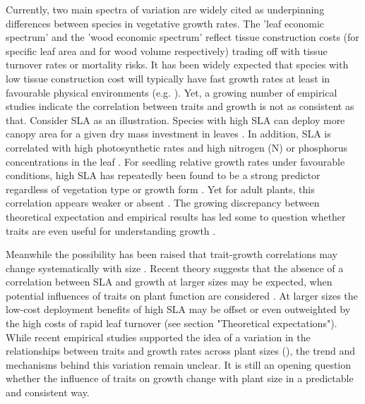 \documentclass[a4paper]{article}\usepackage[]{graphicx}\usepackage[]{color}
\begin{document}
Currently, two main spectra of variation are widely cited as underpinning differences between species in vegetative growth rates. The 'leaf economic spectrum' \citep{Wright:2004jb} and the 'wood economic spectrum' \citep{Chave:2009iy} reflect tissue construction costs (for specific leaf area and for wood volume respectively) trading off with tissue turnover rates or mortality risks. It has been widely expected that species with low tissue construction cost will typically have fast growth rates at least in favourable physical environments (e.g. \citealt{MullerLandau:2004dc,Wright:2004jb,Poorter:2008iu,Chave:2009iy,Larjavaara:2010bn,Iida:2012jb,Paine:2015df}). Yet, a growing number of empirical studies indicate the correlation between traits and growth is not as consistent as that. Consider SLA as an illustration. Species with high SLA can deploy more canopy area for a given dry mass investment in leaves \citep{Poorter:1999wd, Reich:1992wm}. In addition, SLA is correlated with high photosynthetic rates and high nitrogen (N) or phosphorus concentrations in the leaf \citep{Wright:2004jb}. For seedling relative growth rates under favourable conditions, high SLA has repeatedly been found to be a strong predictor regardless of vegetation type or growth form \citep{Lambers:1992bj,Reich:1992wm,Grime:1997wm,Poorter:1999wd,Wright:1999ds}. Yet for adult plants, this correlation appears weaker or absent \citep{coomes_comparison_1998,Poorter:2008iu,Aiba:2009ft,Easdale:2009gv,Wright:2010tp}. The growing discrepancy between theoretical expectation and empirical results has led some to question whether traits are even useful for understanding growth \citep{Wright:2010tp, Paine:2015df}.

Meanwhile the possibility has been raised that trait-growth correlations may change systematically with size \citep{Enquist:2007ek,Falster:2011ii, Ruger:2012jv, Iida:2014ep, Iida:2014hq}. Recent theory suggests that the absence of a correlation between SLA and growth at larger sizes may be expected, when potential influences of traits on plant function are considered \citep{Falster:2011ii, falster:2013}. At larger sizes the low-cost deployment benefits of high SLA may be offset or even outweighted by the high costs of rapid leaf turnover (see section "Theoretical expectations"). While recent empirical studies supported the idea of a variation in the relationships between traits and growth rates across plant sizes (\citealt{Iida:2014ep, Iida:2014hq}), the trend and mechanisms behind this variation remain unclear. It is still an opening question whether the influence of traits on growth change with plant size in a predictable and consistent way.
\end{document}
